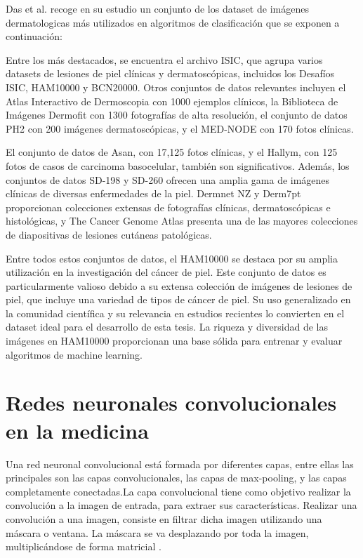 Das et al.  recoge en su estudio un conjunto de los dataset de imágenes dermatologicas más utilizados en algoritmos de clasificación que se exponen a continuación:

Entre los más destacados, se encuentra el archivo ISIC, que agrupa varios datasets de lesiones de piel clínicas y dermatoscópicas, incluidos los Desafíos ISIC, HAM10000 y BCN20000. Otros conjuntos de datos relevantes incluyen el Atlas Interactivo de Dermoscopia con 1000 ejemplos clínicos, la Biblioteca de Imágenes Dermofit con 1300 fotografías de alta resolución, el conjunto de datos PH2 con 200 imágenes dermatoscópicas, y el MED-NODE con 170 fotos clínicas.

El conjunto de datos de Asan, con 17,125 fotos clínicas, y el Hallym, con 125 fotos de casos de carcinoma basocelular, también son significativos. Además, los conjuntos de datos SD-198 y SD-260 ofrecen una amplia gama de imágenes clínicas de diversas enfermedades de la piel. Dermnet NZ y Derm7pt proporcionan colecciones extensas de fotografías clínicas, dermatoscópicas e histológicas, y The Cancer Genome Atlas presenta una de las mayores colecciones de diapositivas de lesiones cutáneas patológicas.

Entre todos estos conjuntos de datos, el HAM10000 se destaca por su amplia utilización en la investigación del cáncer de piel. Este conjunto de datos es particularmente valioso debido a su extensa colección de imágenes de lesiones de piel, que incluye una variedad de tipos de cáncer de piel. Su uso generalizado en la comunidad científica y su relevancia en estudios recientes lo convierten en el dataset ideal para el desarrollo de esta tesis. La riqueza y diversidad de las imágenes en HAM10000 proporcionan una base sólida para entrenar y evaluar algoritmos de machine learning.


\section{Redes neuronales convolucionales en la medicina}   

Una red neuronal convolucional está formada por diferentes capas, entre ellas las principales son las capas convolucionales, las capas de max-pooling, y las capas completamente conectadas.La capa convolucional tiene como objetivo realizar la convolución a la imagen de entrada, para extraer sus características. Realizar una convolución a una imagen, consiste en filtrar dicha imagen utilizando una máscara o ventana. La máscara se va desplazando por toda la imagen, multiplicándose de forma matricial .


